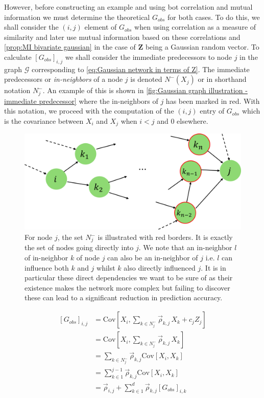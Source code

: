 \documentclass[../Thesis.tex]{subfiles}
\begin{document}
However, before constructing an example and using bot correlation and mutual information we must determine the theoretical $G_{obs}$ for both cases. To do this, we shall consider the $(i,j)$ element of $G_{obs}$ when using correlation as a measure of similarity and later use mutual information based on these correlations and \autoref{prop:MI bivariate gaussian} in the case of $\boldsymbol Z$ being a Gaussian random vector. To calculate $\left[G_{obs}\right]_{i,j}$ we shall consider the immediate predecessors to node $j$ in the graph $\mathcal{G}$ corresponding to \autoref{eq:Gaussian network in terms of Z}. The immediate predecessors or \textit{in-neighbors} of a node $j$ is denoted $N^-\left(X_j\right)$ or in shorthand notation $N^-_j$. An example of this is shown in \autoref{fig:Gaussian graph illustration - immediate predecessor} where the in-neighbors of $j$ has been marked in red. With this notation, we proceed with the computation of the $(i,j)$ entry of $G_{obs}$ which is the covariance between $X_i$ and $X_j$ when $i < j$ and $0$ elsewhere.
\begin{figure}[ht]
    \centering
    \includegraphics[width = .7\linewidth]{figures/ND examples/Gaussian graph illustration - immediate predecessor.png}
    \caption{For node $j$, the set $N^-_j$ is illustrated with red borders. It is exactly the set of nodes going directly into $j$. We note that an in-neighbor $l$ of in-neighbor $k$ of node $j$ can also be an in-neighbor of $j$ i.e. $l$ can influence both $k$ and $j$ whilst $k$ also directly influenced $j$. It is in particular these direct dependencies we want to be sure of as their existence makes the network more complex but failing to discover these can lead to a significant reduction in prediction accuracy.}
    \label{fig:Gaussian graph illustration - immediate predecessor}
\end{figure}
\begin{equation}
    \begin{split}
        \left[G_{obs}\right]_{i,j} & = \text{Cov}\left[X_i , \sum_{k \in N^-_j} \vec{\rho}_{k,j} \, X_k + c_j Z_j\right] \\
                                   & = \text{Cov}\left[X_i , \sum_{k \in N^-_j} \vec{\rho}_{k,j} \, X_k\right]           \\
                                   & = \sum_{k \in N^-_j}\vec{\rho}_{k,j} \text{Cov}\left[X_i, X_k\right]                \\
                                   & = \sum_{k \in 1}^{j-1} \vec{\rho}_{k,j} \text{Cov}\left[X_i, X_k\right]             \\
                                   & = \vec{\rho}_{i,j} + \sum_{k \in 1}^{d} \vec{\rho}_{k,j} \left[G_{obs}\right]_{i,k}
    \end{split}
\end{equation}
\end{document}
